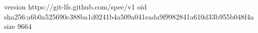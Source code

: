 version https://git-lfs.github.com/spec/v1
oid sha256:a6b0a525690c388ba1d0241b4a509a041eada9f9982841a610d33b955b048f4a
size 9664
